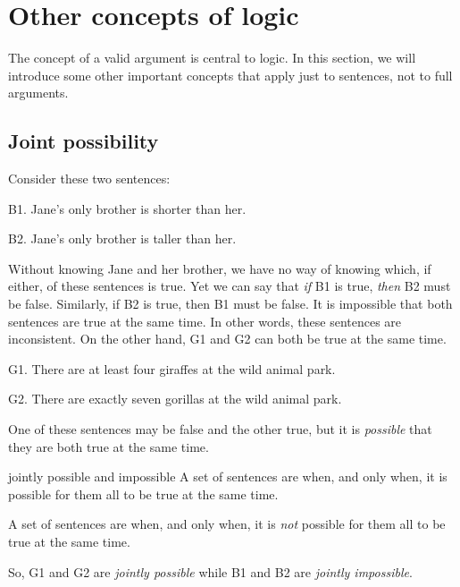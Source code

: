 
\chapter{Other concepts of logic}\label{s:BasicNotions}

The concept of a valid argument is central to logic. In this section, we will introduce some other important concepts that apply just to sentences, not to full arguments. 

\section{Joint possibility}\label{s:joint-poss}

Consider these two sentences:
	\begin{ebullet}
		\item[B1.] Jane's only brother is shorter than her.
		\item[B2.] Jane's only brother is taller than her.
	\end{ebullet}
Without knowing Jane and her brother, we have no way of knowing which, if either, of these sentences is true. Yet we can say that \emph{if} B1 is true, \emph{then} B2 must be false. Similarly, if B2 is true, then B1 must be false. It is impossible that both sentences are true at the same time. In other words, these sentences are inconsistent. On the other hand, G1 and G2 can both be true at the same time.
	\begin{ebullet}	
		\item[G1.] \label{MartianGiraffes} There are at least four giraffes at the wild animal park.
		\item[G2.] There are exactly seven gorillas at the wild animal park.
	\end{ebullet}
One of these sentences may be false and the other true, but it  is \textit{possible} that they are both true at the same time. 

\begin{factboxy}{jointly possible and impossible}
A set of sentences are  when, and only when, it is possible for them all to be true at the same time.
\medskip

A set of sentences are  when, and only when, it is \textit{not} possible for them all to be true at the same time.
\end{factboxy}
\noindent So, G1 and G2 are \textit{jointly possible} while B1 and B2 are \emph{jointly impossible}.

